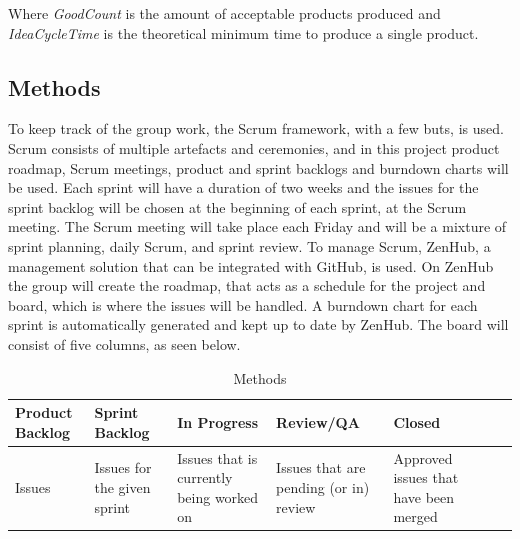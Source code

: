 Where \textit{GoodCount} is the amount of acceptable products produced and
\textit{IdeaCycleTime} is the theoretical minimum time to produce a single
product.


\subsection{Methods}
To keep track of the group work, the Scrum framework, with a few buts, is used.
Scrum consists of multiple artefacts and ceremonies, and in this project product
roadmap, Scrum meetings, product and sprint backlogs and burndown charts will
be used. Each sprint will have a duration of two weeks and the issues for the
sprint backlog will be chosen at the beginning of each sprint, at the Scrum
meeting. The Scrum meeting will take place each Friday and will be a mixture of
sprint planning, daily Scrum, and sprint review. To manage Scrum, ZenHub, a
management solution that can be integrated with GitHub, is used. On ZenHub the
group will create the roadmap, that acts as a schedule for the project and
board, which is where the issues will be handled. A burndown chart for each
sprint is automatically generated and kept up to date by ZenHub. The board will
consist of five columns, as seen below.

\begin{table}[H]
    \begin{tabularx}{\textwidth}{|>{\RaggedRight}X|>{\RaggedRight}X|>{\RaggedRight}X|>{\RaggedRight}X|>{\RaggedRight}X|>{\RaggedRight}X|>{\RaggedRight}X|}
        \hline                             
        \textbf{Product Backlog} & \textbf{Sprint Backlog} & \textbf{In Progress} & \textbf{Review/QA} & \textbf{Closed} \\
        \hline
        Issues & Issues for the given sprint & Issues that is currently being worked on & Issues that are pending (or in) review & Approved issues that have been merged    \\
        \hline
    \end{tabularx}
    \caption{Methods} 
    \label{table:Methods}
\end{table} 